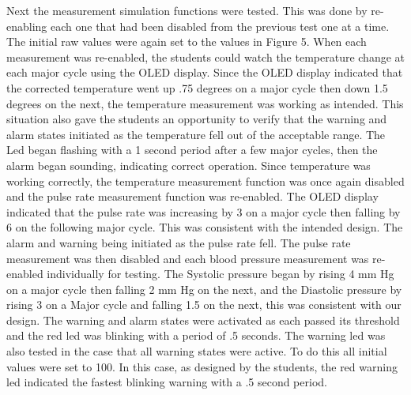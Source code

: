 \documentclass[12pt]{article} %
\begin{document}
    Next the measurement simulation functions were tested. This was done by
    re-enabling each one that had been disabled from the previous test one at a
    time. The initial raw values were again set to the values in Figure 5. When
    each measurement was re-enabled, the students could watch the temperature change
    at each major cycle using the OLED display. Since the OLED display indicated
    that the corrected temperature went up .75 degrees on a major cycle then down
    1.5 degrees on the next, the temperature measurement was working as intended.
    This situation also gave the students an opportunity to verify that the warning
    and alarm states initiated as the temperature fell out of the acceptable range.
    The Led began flashing with a 1 second period after a few major cycles, then
    the alarm began sounding, indicating correct operation. Since temperature was
    working correctly, the temperature measurement function was once again disabled
    and the pulse rate measurement function was re-enabled. The OLED display
    indicated that the pulse rate was increasing by 3 on a major cycle then falling
    by 6 on the following major cycle. This was consistent with the intended
    design. The alarm and warning being initiated as the pulse rate fell. The pulse
    rate measurement was then disabled and each blood pressure measurement was
    re-enabled individually for testing. The Systolic pressure began by rising 4 mm
    Hg on a major cycle then falling 2 mm Hg on the next, and the Diastolic
    pressure by rising 3 on a Major cycle and falling 1.5 on the next, this was
    consistent with our design. The warning and alarm states were activated as each
    passed its threshold and the red led was blinking with a period of .5 seconds.
    The warning led was also tested in the case that all warning states were
    active. To do this all initial values were set to 100. In this case, as
    designed by the students, the red warning led indicated the fastest blinking
    warning with a .5 second period. 
\end{document}
